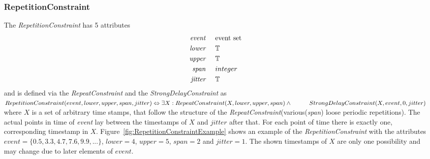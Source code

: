	\subsubsection{RepetitionConstraint}
		The \emph{RepetitionConstraint} has 5 attributes
		\begin{align*}
			\emph{event} & \hspace{.5cm}\text{event set}\\
			\emph{lower} & \hspace{.5cm}\text{$\mathbb{T}$}\\
			\emph{upper} & \hspace{.5cm}\text{$\mathbb{T}$}\\
			\emph{span}	 & \hspace{.5cm}\text{$integer$}\\
			\emph{jitter}& \hspace{.5cm}\mathbb{T}
		\end{align*}
		and is defined via the \emph{RepeatConstraint} and the \emph{StrongDelayConstraint} as\\[10pt]
		\begin{math}
			RepetitionConstraint ( event, lower, upper, span, jitter )\\
			\Leftrightarrow
			\exists X: RepeatConstraint(X, lower, upper, span) \land \\
			\text{\hspace{1cm}}StrongDelayConstraint(X, event, 0, jitter)
		\end{math}\\[10pt]
		where $X$ is a set of arbitrary time stamps, that follow the structure of the \emph{RepeatConstraint}(various(\emph{span}) loose periodic repetitions). The actual points in time of \emph{event} lay between the timestamps of $X$ and $jitter$ after that. For each point of time there is exactly one, corresponding timestamp in $X$.
		Figure~\ref{fig:RepetitionConstraintExample} shows an example of the \emph{RepetitionConstraint} with the attributes $event=\{0.5, 3.3, 4.7, 7.6, 9.9, ...\}$, $lower=4$, $upper=5$, $span=2$ and $jitter=1$. The shown timestamps of $X$ are only one possibility and may change due to later elements of $event$.
		
